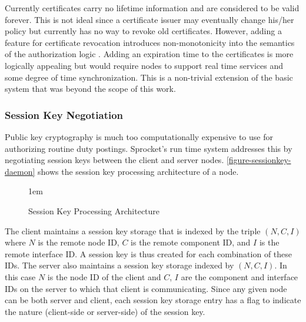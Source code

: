 Currently certificates carry no lifetime information and are considered to be valid forever.
This is not ideal since a certificate issuer may eventually change his/her policy but currently
has no way to revoke old certificates. However, adding a feature for certificate revocation
introduces non-monotonicity into the semantics of the authorization logic
\cite{Li01nonmonotonicity,Rivest:1998:WEC:647502.728327}. Adding an expiration time to the
certificates is more logically appealing but would require nodes to support real time services
and some degree of time synchronization. This is a non-trivial extension of the basic system
that was beyond the scope of this work.

\subsubsection{Session Key Negotiation}

Public key cryptography is much too computationally expensive to use for authorizing routine
duty postings. Sprocket's run time system addresses this by negotiating session keys between the
client and server nodes. \autoref{figure-sessionkey-daemon} shows the session key processing
architecture of a node.

\begin{figure}[htbp]
  
  \centerline{\raise 1em\box\graph}
  \caption{Session Key Processing Architecture}
  \label{figure-sessionkey-daemon}
\end{figure}

The client maintains a session key storage that is indexed by the triple $(N, C, I)$ where $N$
is the remote node ID, $C$ is the remote component ID, and $I$ is the remote interface ID. A
session key is thus created for each combination of these IDs. The server also maintains a
session key storage indexed by $(N, C, I)$. In this case $N$ is the node ID of the client and
$C$, $I$ are the component and interface IDs on the server to which that client is
communicating. Since any given node can be both server and client, each session key storage
entry has a flag to indicate the nature (client-side or server-side) of the session key.

%


